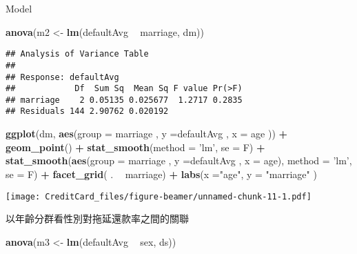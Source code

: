 \documentclass[ignorenonframetext,]{beamer}
\newenvironment{Shaded}{\begin{snugshade}}{\end{snugshade}}
\newcommand{\KeywordTok}[1]{\textcolor[rgb]{0.13,0.29,0.53}{\textbf{#1}}}
\newcommand{\DataTypeTok}[1]{\textcolor[rgb]{0.13,0.29,0.53}{#1}}
\newcommand{\StringTok}[1]{\textcolor[rgb]{0.31,0.60,0.02}{#1}}
\newcommand{\OperatorTok}[1]{\textcolor[rgb]{0.81,0.36,0.00}{\textbf{#1}}}
\newcommand{\NormalTok}[1]{#1}
\begin{document}
\begin{frame}[fragile]{Model}
\begin{Shaded}
\begin{Highlighting}[]
\KeywordTok{anova}\NormalTok{(m2 <-}\StringTok{ }\KeywordTok{lm}\NormalTok{(defaultAvg }\OperatorTok{~}\StringTok{ }\NormalTok{marriage, dm))}
\end{Highlighting}
\end{Shaded}

\begin{verbatim}
## Analysis of Variance Table
## 
## Response: defaultAvg
##            Df  Sum Sq  Mean Sq F value Pr(>F)
## marriage    2 0.05135 0.025677  1.2717 0.2835
## Residuals 144 2.90762 0.020192
\end{verbatim}

\begin{Shaded}
\begin{Highlighting}[]
\KeywordTok{ggplot}\NormalTok{(dm, }\KeywordTok{aes}\NormalTok{(}\DataTypeTok{group =}\NormalTok{ marriage , }
               \DataTypeTok{y =}\NormalTok{defaultAvg , }\DataTypeTok{x =}\NormalTok{ age )) }\OperatorTok{+}
\StringTok{  }\KeywordTok{geom_point}\NormalTok{() }\OperatorTok{+}
\StringTok{  }\KeywordTok{stat_smooth}\NormalTok{(}\DataTypeTok{method =} \StringTok{'lm'}\NormalTok{, }\DataTypeTok{se =}\NormalTok{ F) }\OperatorTok{+}
\StringTok{  }\KeywordTok{stat_smooth}\NormalTok{(}\KeywordTok{aes}\NormalTok{(}\DataTypeTok{group =}\NormalTok{ marriage , }
                  \DataTypeTok{y =}\NormalTok{defaultAvg , }\DataTypeTok{x =}\NormalTok{ age), }
              \DataTypeTok{method =} \StringTok{'lm'}\NormalTok{, }\DataTypeTok{se =}\NormalTok{ F) }\OperatorTok{+}\StringTok{ }
\StringTok{  }\KeywordTok{facet_grid}\NormalTok{( . }\OperatorTok{~}\StringTok{  }\NormalTok{marriage) }\OperatorTok{+}
\StringTok{  }\KeywordTok{labs}\NormalTok{(}\DataTypeTok{x =}\StringTok{"age"}\NormalTok{, }\DataTypeTok{y =} \StringTok{"marriage"}\NormalTok{ )}
\end{Highlighting}
\end{Shaded}

\texttt{[image: CreditCard\_files/figure-beamer/unnamed-chunk-11-1.pdf]}

以年齡分群看性別對拖延還款率之間的關聯

\begin{Shaded}
\begin{Highlighting}[]
\KeywordTok{anova}\NormalTok{(m3 <-}\StringTok{ }\KeywordTok{lm}\NormalTok{(defaultAvg }\OperatorTok{~}\StringTok{ }\NormalTok{sex, ds))}
\end{Highlighting}
\end{Shaded}


\end{frame}
\end{document}
